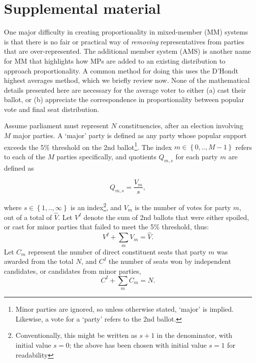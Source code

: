\documentclass[DIV=calc, paper=a4, fontsize=11pt, twocolumn]{scrartcl}	 %
\begin{document}
\clearpage
\renewcommand{\theequation}{S.\arabic{equation}}
\renewcommand{\thesection}{S.\arabic{section}}
\setcounter{section}{0}
\setcounter{equation}{0}
\section*{Supplemental material}

One major difficulty in creating proportionality in mixed-member (MM) systems is that there is no fair or practical way of \emph{removing} representatives from parties that are over-represented. 
The additional member system (AMS) is another name for MM that highlights how MPs are added to an existing distribution to approach proportionality. 
A common method for doing this uses the D'Hondt highest averages method, which we briefly review now. None of the mathematical details presented here are necessary for the average voter to either (a) cast their ballot, or (b) appreciate the correspondence in proportionality between popular vote and final seat distribution.

Assume parliament must represent $N$ constituencies, after an election involving $M$ major parties. A `major' party is defined as any party whose popular support exceeds the 5\% threshold on the 2nd ballot\footnote{Minor parties are ignored, so unless otherwise stated, `major' is implied. Likewise, a vote for a `party' refers to the 2nd ballot.}. 
The index  $m \in \left\{0, .., M-1\right\} $  refers to each of the $M$ parties specifically, and quotients $Q_{m,s}$ for each party $m$ are defined as 

\begin{equation}
\label{eq:DhondtSupp}
Q_{m,s} = \frac{V_m}{s},
\end{equation}

where $s \in \left\{ 1,.., \infty \right\}$ is an index\footnote{Conventionally, this might be written as $s+1$ in the denominator, with initial value $s=0$; the above has been chosen with initial value $s=1$ for readability}, and  $V_m$ is the number of votes for party $m$, out of a total of $\hat{V}$. Let $V^I$ denote the sum of 2nd ballots that were either spoiled, or cast for minor parties that failed to meet the 5\% threshold, thus: 
\begin{equation}
\label{eq:sum_Vm}
V^I + \sum_m V_m = \hat{V}.
\end{equation}
Let $C_m$ represent the number of direct constituent seats that party $m$ was awarded from the total $N$, and $C^I$ the number of seats won by independent candidates, or candidates from minor parties,
\begin{equation}
\label{eq:sum_Cm}
C^I + \sum_m C_m = N.
\end{equation}
\end{document}
